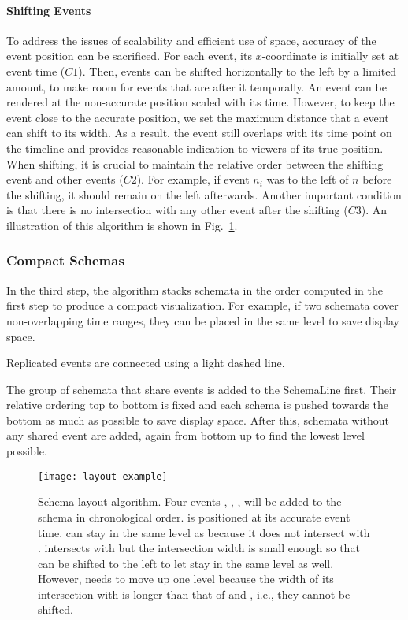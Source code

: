 \paragraph*{Shifting Events}
To address the issues of scalability and efficient use of space, accuracy of the event position can be sacrificed. For each event, its $x$-coordinate is initially set at event time ($C1$). Then, events can be shifted horizontally to the left by a limited amount, to make room for events that are after it temporally. An event can be rendered at the non-accurate position scaled with its time. However, to keep the event close to the accurate position, we set the maximum distance that a event can shift to its width. As a result, the event still overlaps with its time point on the timeline and provides reasonable indication to viewers of its true position. When shifting, it is crucial to maintain the relative order between the shifting event and other events ($C2$). For example, if event $n_i$ was to the left of $n$ before the shifting, it should remain on the left afterwards. Another important condition is that there is no intersection with any other event after the shifting ($C3$). An illustration of this algorithm is shown in Fig.~\ref{fig:layout-schema-example}.

\subsubsection{Compact Schemas}
\label{sub:layout-compact}
In the third step, the algorithm stacks schemata in the order computed in the first step to produce a compact visualization. For example, if two schemata cover non-overlapping time ranges, they can be placed in the same level to save display space. 

Replicated events are connected using a light dashed line.

The group of schemata that share events is added to the SchemaLine first. Their relative ordering top to bottom is fixed and each schema is pushed towards the bottom as much as possible to save display space. After this, schemata without any shared event are added, again from bottom up to find the lowest level possible.

\begin{figure}[ht]
\centering
\texttt{[image: layout-example]}
\caption{Schema layout algorithm. Four events , , ,  will be added to the schema in chronological order.  is positioned at its accurate event time.  can stay in the same level as  because it does not intersect with .  intersects with  but the intersection width is small enough so that  can be shifted to the left to let  stay in the same level as well. However,  needs to move up one level because the width of its intersection with  is longer than that of  and , i.e., they cannot be shifted.}
\label{fig:layout-schema-example}
\end{figure}

